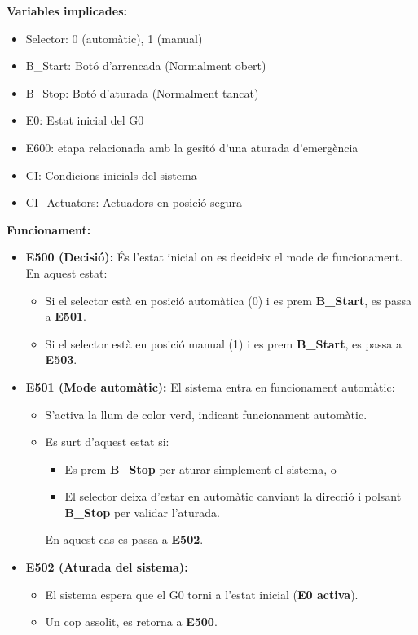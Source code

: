 \documentclass[12pt,a4paper]{report}
\begin{document}
\textbf{Variables implicades:}
\begin{itemize}
\item Selector: 0 (automàtic), 1 (manual)
\item B\_Start: Botó d'arrencada (Normalment obert)
\item B\_Stop: Botó d'aturada (Normalment tancat)
\item E0: Estat inicial del G0
\item E600: etapa relacionada amb la gesitó d'una aturada d'emergència
\item CI: Condicions inicials del sistema
\item CI\_Actuators: Actuadors en posició segura
\end{itemize}

\textbf{Funcionament:}

\begin{itemize}

\item \textbf{E500 (Decisió):}  
És l'estat inicial on es decideix el mode de funcionament.  
En aquest estat:
\begin{itemize}
\item Si el selector està en posició automàtica (0) i es prem \textbf{B\_Start}, es passa a \textbf{E501}.
\item Si el selector està en posició manual (1) i es prem \textbf{B\_Start}, es passa a \textbf{E503}.
\end{itemize}

\item \textbf{E501 (Mode automàtic):}  
El sistema entra en funcionament automàtic:
\begin{itemize}
\item S'activa la llum de color verd, indicant funcionament automàtic.
\item Es surt d'aquest estat si:
\begin{itemize}
\item Es prem \textbf{B\_Stop} per aturar simplement el sistema, o
\item El selector deixa d'estar en automàtic canviant la direcció i polsant  \textbf{B\_Stop} per validar l'aturada.
\end{itemize}
En aquest cas es passa a \textbf{E502}.
\end{itemize}

\item \textbf{E502 (Aturada del sistema):}  
\begin{itemize}
\item El sistema espera que el G0 torni a l'estat inicial (\textbf{E0 activa}).
\item Un cop assolit, es retorna a \textbf{E500}.
\end{itemize}


\end{itemize}
\end{document}
